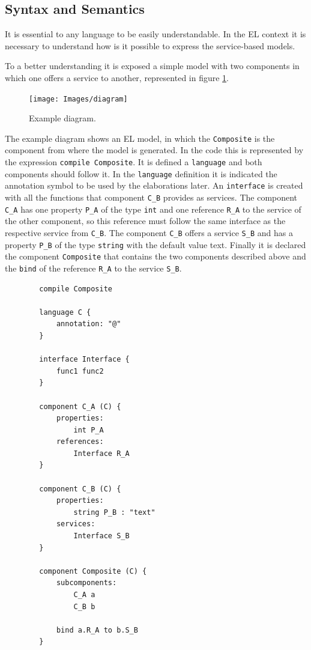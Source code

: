 \documentclass{report}
\begin{document}
		\subsection{Syntax and Semantics}
		
		\par It is essential to any language to be easily understandable. In the EL context it is necessary to understand how is it possible to express the service-based models.
		\par To a better understanding it is exposed a simple model with two components in which one offers a service to another, represented in figure \ref{fig:example-diagram}.
		
		\begin{figure} [H]
			\centering
			\texttt{[image: Images/diagram]}
			\caption{Example diagram.}
			\label{fig:example-diagram}
		\end{figure}
		
		\par The example diagram shows an EL model, in which the \texttt{Composite} is the component from where the model is generated. In the code this is represented by the expression \texttt{compile Composite}. It is defined a \texttt{language} and both components should follow it. In the \texttt{language} definition it is indicated the annotation symbol to be used by the elaborations later. An \texttt{interface} is created with all the functions that component \texttt{C\_B} provides as services. The component \texttt{C\_A} has one property \texttt{P\_A} of the type \texttt{int} and one reference \texttt{R\_A} to the service of the other component, so this reference must follow the same interface as the respective service from \texttt{C\_B}. The component \texttt{C\_B} offers a service \texttt{S\_B} and has a property \texttt{P\_B} of the type \texttt{string} with the default value text. Finally it is declared the component \texttt{Composite} that contains the two components described above and the \texttt{bind} of the reference \texttt{R\_A} to the service \texttt{S\_B}.
		
		\begin{lstlisting}
		compile Composite

		language C {
			annotation: "@"
		}
		
		interface Interface {
			func1 func2
		}
		
		component C_A (C) {
			properties:
				int P_A
			references:
				Interface R_A
		}
		
		component C_B (C) {
			properties:
				string P_B : "text"
			services:
				Interface S_B
		}
		
		component Composite (C) {
			subcomponents:
				C_A a
				C_B b
			
			bind a.R_A to b.S_B
		}
		\end{lstlisting} 			
			
\end{document}
